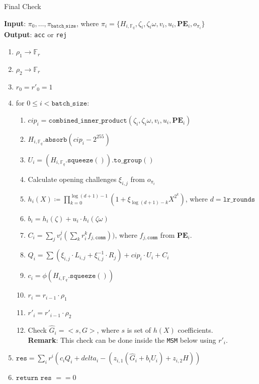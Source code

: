 \begin{algorithm}[H]
    \caption{Final Check}
    \textbf{Input}: $\pi_0, \dots, \pi_{\texttt{batch\_size}}$, where $\pi_i = \{H_{i, \mathbb{F}_q}, \zeta_i, \zeta_i\omega, v_i, u_i,
    \textbf{PE}_i, o_{\pi_i} \}$ \\
    \textbf{Output}: \texttt{acc} or \texttt{rej}
    \begin{enumerate}
        \item $\rho_1 \rightarrow \mathbb{F}_r$
        \item $\rho_2 \rightarrow \mathbb{F}_r$
        \item $r_0 = r'_0 = 1$
        \item for $0 \leq i < \texttt{batch\_size}$:
        \begin{enumerate}
            \item $cip_i = \texttt{combined\_inner\_product}(\zeta_i, \zeta_i\omega, v_i, u_i, \textbf{PE}_i)$
            \item $H_{i, \mathbb{F}_q}.\texttt{absorb}(cip_i - 2^{255})$
            \item $U_i = (H_{i, \mathbb{F}_q}.\texttt{squeeze}()).\texttt{to\_group}()$
            \item Calculate opening challenges $\xi_{i, j}$ from $o_{\pi_i}$
            \item $h_i(X) \coloneqq \prod_{k=0}^{\log(d+1) - 1}(1 + \xi_{\log(d+1)-k}X^{2^k})$, where $d = \texttt{lr\_rounds}$
            \item $b_i = h_i(\zeta) + u_i \cdot h_i(\zeta\omega)$
            \item $C_i = \sum\limits_{j}v_i^j(\sum\limits_{k}r_i^k f_{j, \texttt{comm}}))$, where $f_{j, \texttt{comm}}$ from $\textbf{PE}_i$.
            \item $Q_i = \sum (\xi_{i, j} \cdot L_{i, j} + \xi_{i, j}^{-1} \cdot R_j) + cip_i \cdot U_i + C_i$
            \item $c_i = \phi(H_{i, \mathbb{F}_q}.\texttt{squeeze}())$
            \item $r_i = r_{i - 1} \cdot \rho_1$
            \item $r'_i = r'_{i - 1} \cdot \rho_2$
            \item Check $\hat{G}_i = <s, G>$, where $s$ is set of $h(X)$ coefficients. \\
            \textbf{Remark}: This check can be done inside the \texttt{MSM} below using $r'_i$.
        \end{enumerate}
        \item $\texttt{res} = \sum\limits_i r^i (c_i Q_i + delta_i - ( z_{i, 1} (\hat{G}_i + b_i U_i) + z_{i, 2} H ))$
        \item $\texttt{return res } == 0$
    \end{enumerate}
\end{algorithm}

